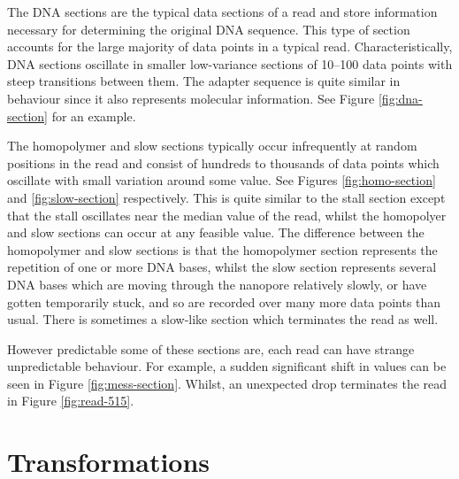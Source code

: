 

The DNA sections are the typical data sections of a read and store information necessary for determining the original DNA sequence. This type of section accounts for the large majority of data points in a typical read. Characteristically, DNA sections oscillate in smaller low-variance sections of 10--100 data points with steep transitions between them. The adapter sequence is quite similar in behaviour since it also represents molecular information. See Figure \ref{fig:dna-section} for an example.



The homopolymer and slow sections typically occur infrequently at random positions in the read and consist of hundreds to thousands of data points which oscillate with small variation around some value. See Figures \ref{fig:homo-section} and \ref{fig:slow-section} respectively. This is quite similar to the stall section except that the stall oscillates near the median value of the read, whilst the homopolyer and slow sections can occur at any feasible value. The difference between the homopolymer and slow sections is that the homopolymer section represents the repetition of one or more DNA bases, whilst the slow section represents several DNA bases which are moving through the nanopore relatively slowly, or have gotten temporarily stuck, and so are recorded over many more data points than usual. There is sometimes a slow-like section which terminates the read as well.




However predictable some of these sections are, each read can have strange unpredictable behaviour. For example, a sudden significant shift in values can be seen in Figure \ref{fig:mess-section}. Whilst, an unexpected drop terminates the read in Figure \ref{fig:read-515}.




\section{Transformations}





